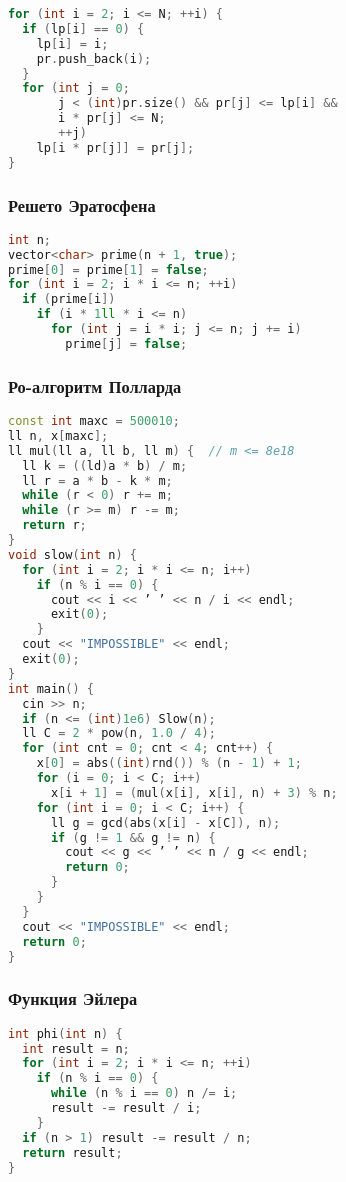 \documentclass[10pt,a4paper,landscape,twosided]{extarticle}
\begin{document}
\begin{multicols}{3}
\begin{lstlisting}[language=C++]
for (int i = 2; i <= N; ++i) {
  if (lp[i] == 0) {
    lp[i] = i;
    pr.push_back(i);
  }
  for (int j = 0;
       j < (int)pr.size() && pr[j] <= lp[i] &&
       i * pr[j] <= N;
       ++j)
    lp[i * pr[j]] = pr[j];
}
\end{lstlisting}

\subsubsection{Решето Эратосфена}
\begin{lstlisting}[language=C++]
int n;
vector<char> prime(n + 1, true);
prime[0] = prime[1] = false;
for (int i = 2; i * i <= n; ++i)
  if (prime[i])
    if (i * 1ll * i <= n)
      for (int j = i * i; j <= n; j += i)
        prime[j] = false;
\end{lstlisting}

\subsubsection{Ро-алгоритм Полларда}
\begin{lstlisting}[language=C++]
const int maxc = 500010;
ll n, x[maxc];
ll mul(ll a, ll b, ll m) {  // m <= 8e18
  ll k = ((ld)a * b) / m;
  ll r = a * b - k * m;
  while (r < 0) r += m;
  while (r >= m) r -= m;
  return r;
}
void slow(int n) {
  for (int i = 2; i * i <= n; i++)
    if (n % i == 0) {
      cout << i << ’ ’ << n / i << endl;
      exit(0);
    }
  cout << "IMPOSSIBLE" << endl;
  exit(0);
}
int main() {
  cin >> n;
  if (n <= (int)1e6) Slow(n);
  ll C = 2 * pow(n, 1.0 / 4);
  for (int cnt = 0; cnt < 4; cnt++) {
    x[0] = abs((int)rnd()) % (n - 1) + 1;
    for (i = 0; i < C; i++)
      x[i + 1] = (mul(x[i], x[i], n) + 3) % n;
    for (int i = 0; i < C; i++) {
      ll g = gcd(abs(x[i] - x[C]), n);
      if (g != 1 && g != n) {
        cout << g << ’ ’ << n / g << endl;
        return 0;
      }
    }
  }
  cout << "IMPOSSIBLE" << endl;
  return 0;
}\end{lstlisting}

\subsubsection{Функция Эйлера}
\begin{lstlisting}[language=C++]
int phi(int n) {
  int result = n;
  for (int i = 2; i * i <= n; ++i)
    if (n % i == 0) {
      while (n % i == 0) n /= i;
      result -= result / i;
    }
  if (n > 1) result -= result / n;
  return result;
}
\end{lstlisting}


\end{multicols}
\end{document}
